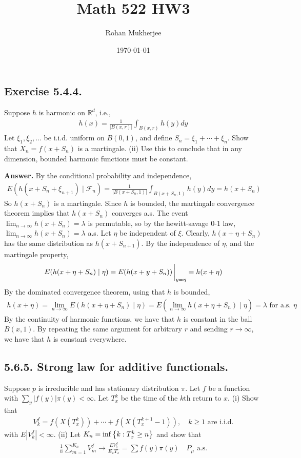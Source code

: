 \documentclass[12pt]{article}
\title{Math 522 HW3}
\date{\today}
\author{Rohan Mukherjee}
\def\mbb#1{\mathbb{#1}}
\def\R{\mbb{R}}
\newcommand{\SET}[1]{\Set{\mskip-\medmuskip #1 \mskip-\medmuskip}}
\begin{document}
    \maketitle
    \subsection*{Exercise 5.4.4.}
    Suppose $h$ is harmonic on $\R^d$, i.e.,
    \begin{align*}
        h(x) = \frac{1}{|B(x,r)|} \int_{B(x,r)} h(y) dy
    \end{align*}
    Let $\xi_1, \xi_2, \ldots$ be i.i.d. uniform on $B(0,1)$, and define $S_n = \xi_1 + \cdots + \xi_n$. Show that $X_n = f(x+S_n)$ is a martingale. (ii) Use this to conclude that in any dimension, bounded harmonic functions must be constant.

    \textbf{Answer.}
    By the conditional probability and independence,
    \begin{align*}
        E(h(x+S_n + \xi_{n+1}) \mid \mathcal F_n) = \frac{1}{|B(x+S_n,1)|}\int_{B(x+S_n,1)} h(y)dy = h(x+S_n)
    \end{align*}
    So $h(x+S_n)$ is a martingale. Since $h$ is bounded, the martingale convergence theorem implies that $h(x+S_n)$ converges a.s. The event $\lim_{n \to \infty} h(x+S_n) = \lambda$ is permutable, so by the hewitt-savage 0-1 law, $\lim_{n \to \infty} h(x+S_n) = \lambda$ a.s. Let $\eta$ be independent of $\xi$. Clearly, $h(x+\eta+S_n)$ has the same distribution as $h(x+S_{n+1})$. By the independence of $\eta$, and the martingale property,
    \begin{align*}
        E(h(x+\eta+S_n) \mid \eta) = E(h(x+y+S_n)) \eval_{y = \eta} = h(x+\eta)
    \end{align*}
    By the dominated convergence theorem, using that $h$ is bounded,
    \begin{align*}
        h(x+\eta) = \lim_{n \to \infty} E(h(x+\eta+S_n) \mid \eta) = E(\lim_{n \to \infty} h(x+\eta+S_n) \mid \eta) = \lambda \text{ for a.s. } \eta
    \end{align*}
    By the continuity of harmonic functions, we have that $h$ is constant in the ball $B(x,1)$. By repeating the same argument for arbitrary $r$ and sending $r \to \infty$, we have that $h$ is constant everywhere.

    \subsection*{5.6.5. Strong law for additive functionals.} Suppose $p$ is irreducible and has stationary distribution $\pi$. Let $f$ be a function with $\sum_y |f(y)|\pi(y) < \infty$. Let $T^k_x$ be the time of the $k$th return to $x$. (i) Show that
    \begin{align*}
        V_k^f = f(X(T^k_x)) + \cdots + f(X(T^{k+1}_x - 1)), \quad k \geq 1 \text{ are i.i.d.}
    \end{align*} 
    with $E|V_k^f| < \infty$. (ii) Let $K_n = \inf \SET{k : T^k_x \geq n}$ and show that 
    \begin{align*}
        \frac 1n \sum_{m=1}^{K_n} V_m^f \to \frac{EV_1^f}{E_x T_x} = \sum f(y) \pi(y) \quad P_\mu \text{ a.s.}
    \end{align*}
\end{document}
